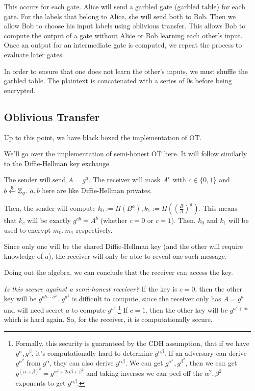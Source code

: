 This occurs for each gate. Alice will send a garbled gate (garbled table) for each gate. For the labels that belong to Alice, she will send both to Bob. Then we allow Bob to choose his input labels using oblivious transfer. This allows Bob to compute the output of a gate without Alice or Bob learning each other's input. Once an output for an intermediate gate is computed, we repeat the process to evaluate later gates.


In order to ensure that one does not learn the other's inputs, we must shuffle the garbled table. The plaintext is concatenated with a series of 0s before being encrypted.

\subsection{Oblivious Transfer}
Up to this point, we have black boxed the implementation of OT.

We'll go over the implementation of semi-honest OT here. It will follow similarly to the Diffie-Hellman key exchange.


The sender will send $A = g^a$. The receiver will mask $A^c$ with $c\in \{0,1\}$ and $b\overset{\$}{\leftarrow} \mathbb Z_q$. $a,b$ here are like Diffie-Hellman privates.

Then, the sender will compute $k_0 := H(B^a), k_1 := H\left( \left( \frac{B}{A} \right)^a \right)$. This means that $k_c$ will be exactly $g^{ab} = A^b$ (whether $c = 0$ or $c = 1$). Then, $k_0$ and $k_1$ will be used to encrypt $m_0, m_1$ respectively.

Since only one will be the shared Diffie-Hellman key (and the other will require knowledge of $a$), the receiver will only be able to reveal one such message.

Doing out the algebra, we can conclude that the receiver can access the key.


\emph{Is this secure against a semi-honest receiver?} If the key is $c = 0$, then the other key will be $g^{ab-a^2}$. $g^{a^2}$ is difficult to compute, since the receiver only has $A = g^a$ and will need secret $a$ to compute $g^{a^2}$.\footnote{Formally, this security is guaranteed by the CDH assumption, that if we have $g^{\alpha}, g^{\beta}$, it's computationally hard to determine $g^{\alpha\beta}$. If an adversary can derive $g^{\alpha^2}$ from $g^{\alpha}$, they can also derive $g^{\alpha\beta}$. We can get $g^{\alpha^2}, g^{\beta^2}$, then we can get $g^{(\alpha+\beta)^2}=g^{\alpha^2 + 2\alpha\beta + \beta^2}$ and taking inverses we can peel off the $\alpha^2,\beta^2$ exponents to get $g^{\alpha\beta}$.} If $c = 1$, then the other key will be $g^{a^2 + ab}$ which is hard again. So, for the receiver, it is computationally secure.

